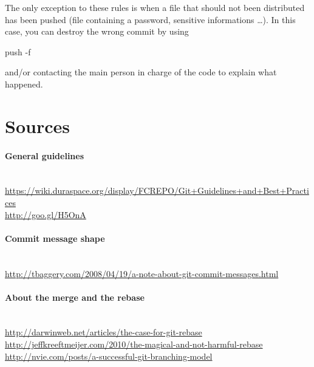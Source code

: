 The only exception to these rules is when a file that should not been distributed has been pushed (file containing a password, sensitive informations \ldots).
In this case, you can destroy the wrong commit by using \begin{tt}push -f\end{tt} and/or contacting the main person in charge of the code to explain what happened.

\section{Sources}

\paragraph{General guidelines}~\\
\small{\url{https://wiki.duraspace.org/display/FCREPO/Git+Guidelines+and+Best+Practices}}\\
\small{\url{http://goo.gl/H5OnA}}\\

\paragraph{Commit message shape}~\\
\small{\url{http://tbaggery.com/2008/04/19/a-note-about-git-commit-messages.html}}\\

\paragraph{About the merge and the rebase}~\\
\small{\url{http://darwinweb.net/articles/the-case-for-git-rebase}}\\
\small{\url{http://jeffkreeftmeijer.com/2010/the-magical-and-not-harmful-rebase}}\\
\small{\url{http://nvie.com/posts/a-successful-git-branching-model}}\\
%